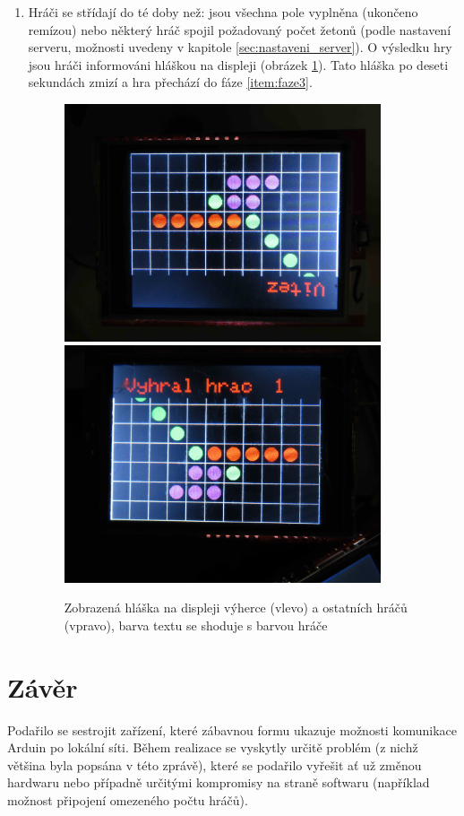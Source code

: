 \documentclass[a4paper,12pt, twoside]{article} %
\begin{document}
\begin{enumerate}
\item Hráči se střídají do té doby než: jsou všechna pole vyplněna (ukončeno remízou) nebo některý hráč spojil požadovaný počet žetonů (podle nastavení serveru, možnosti uvedeny v kapitole \ref{sec:nastaveni_server}). O výsledku hry jsou hráči informováni hláškou na displeji (obrázek \ref{fig:faze6}). Tato hláška po deseti sekundách zmizí a hra přechází do fáze \ref{item:faze3}.
\begin{figure}[H]
\centering
\includegraphics[height=7cm, angle=-90]{img/foto/faze6a.jpg}
\includegraphics[height=7cm, angle=-90]{img/foto/faze6b.jpg}
\caption{\label{fig:faze6} Zobrazená hláška na displeji výherce (vlevo) a ostatních hráčů (vpravo), barva textu se shoduje s barvou hráče}
\end{figure}
\end{enumerate}
\clearpage
\section{Závěr}
Podařilo se sestrojit zařízení, které zábavnou formu ukazuje možnosti komunikace Arduin po lokální síti. Během realizace se vyskytly určitě problém (z nichž většina byla popsána v této zprávě), které se podařilo vyřešit ať už změnou hardwaru nebo případně určitými kompromisy na straně softwaru (například možnost připojení omezeného počtu hráčů).  
\end{document}
